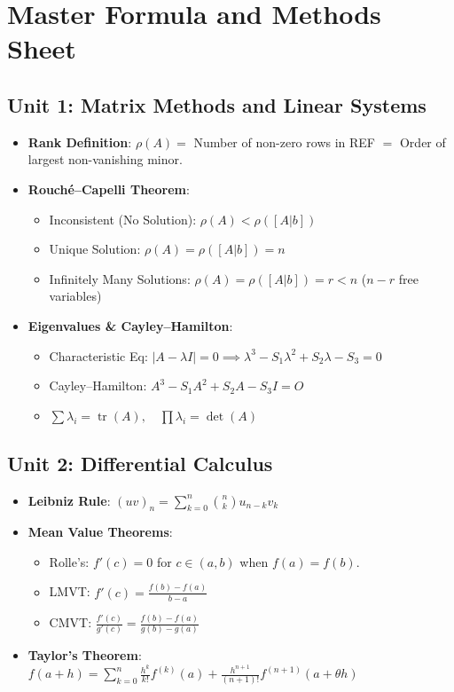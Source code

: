 \chapter{Master Formula and Methods Sheet}
\label{chap:formula-methods-sheet}

\section{Unit 1: Matrix Methods and Linear Systems}
\begin{itemize}[leftmargin=1.5em]
    \item \textbf{Rank Definition}: $\rho(A) =$ Number of non-zero rows in REF $=$ Order of largest non-vanishing minor.
    \item \textbf{Rouch\'e--Capelli Theorem}:
    \begin{itemize}
        \item Inconsistent (No Solution): $\rho(A) < \rho([A|b])$
        \item Unique Solution: $\rho(A) = \rho([A|b]) = n$
        \item Infinitely Many Solutions: $\rho(A) = \rho([A|b]) = r < n$ ($n-r$ free variables)
    \end{itemize}
    \item \textbf{Eigenvalues \& Cayley--Hamilton}:
    \begin{itemize}
        \item Characteristic Eq: $|A - \lambda I| = 0 \implies \lambda^3 - S_1 \lambda^2 + S_2 \lambda - S_3 = 0$
        \item Cayley--Hamilton: $A^3 - S_1 A^2 + S_2 A - S_3 I = O$
        \item $\sum \lambda_i = \operatorname{tr}(A), \quad \prod \lambda_i = \det(A)$
    \end{itemize}
\end{itemize}

\section{Unit 2: Differential Calculus}
\begin{itemize}[leftmargin=1.5em]
    \item \textbf{Leibniz Rule}: $(uv)_n = \sum_{k=0}^n \binom{n}{k} u_{n-k} v_k$
    \item \textbf{Mean Value Theorems}:
    \begin{itemize}
        \item Rolle's: $f'(c) = 0$ for $c \in (a,b)$ when $f(a)=f(b)$.
        \item LMVT: $f'(c) = \frac{f(b)-f(a)}{b-a}$
        \item CMVT: $\frac{f'(c)}{g'(c)} = \frac{f(b)-f(a)}{g(b)-g(a)}$
    \end{itemize}
    \item \textbf{Taylor's Theorem}: $f(a+h) = \sum_{k=0}^n \frac{h^k}{k!} f^{(k)}(a) + \frac{h^{n+1}}{(n+1)!} f^{(n+1)}(a+\theta h)$
\end{itemize}

